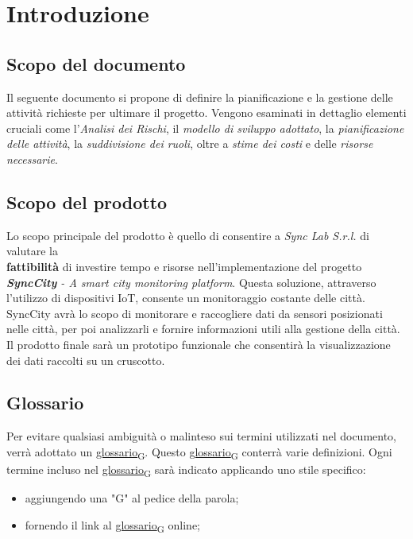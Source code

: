 \section{Introduzione}
\setcounter{subsection}{0}
\subsection{Scopo del documento}
Il seguente documento si propone di definire la pianificazione e la gestione delle attività richieste per ultimare il progetto. Vengono esaminati in dettaglio elementi cruciali come l’\textit{Analisi dei Rischi}, il \textit{modello di sviluppo adottato}, la \textit{pianificazione delle attività}, la \textit{suddivisione dei ruoli}, oltre a \textit{stime dei costi} e delle \textit{risorse necessarie}.

\subsection{Scopo del prodotto}
Lo scopo principale del prodotto è quello di consentire a \textit{Sync Lab S.r.l.} di valutare la \\\textbf{fattibilità} di investire tempo e risorse nell'implementazione del progetto  \textit{\textbf{SyncCity} - A smart city monitoring platform}. Questa soluzione, attraverso l'utilizzo di dispositivi IoT, consente un monitoraggio costante delle città. SyncCity avrà lo scopo di monitorare e raccogliere dati da sensori posizionati nelle città, per poi analizzarli e fornire informazioni utili alla gestione della città. Il prodotto finale sarà un prototipo funzionale che consentirà la visualizzazione dei dati raccolti su un cruscotto.

\subsection{Glossario}
Per evitare qualsiasi ambiguità o malinteso sui termini utilizzati nel documento, verrà adottato un \href{https://7last.github.io/docs/rtb/documentazione-interna/glossario\#glossario}{glossario\textsubscript{G}}. Questo \href{https://7last.github.io/docs/rtb/documentazione-interna/glossario\#glossario}{glossario\textsubscript{G}} conterrà varie definizioni. Ogni termine incluso nel \href{https://7last.github.io/docs/rtb/documentazione-interna/glossario\#glossario}{glossario\textsubscript{G}} sarà indicato applicando uno stile specifico:
\begin{itemize}
    \item aggiungendo una "G" al pedice della parola;
    \item fornendo il link al \href{https://7last.github.io/docs/rtb/documentazione-interna/glossario\#glossario}{glossario\textsubscript{G}} online;
\end{itemize}

